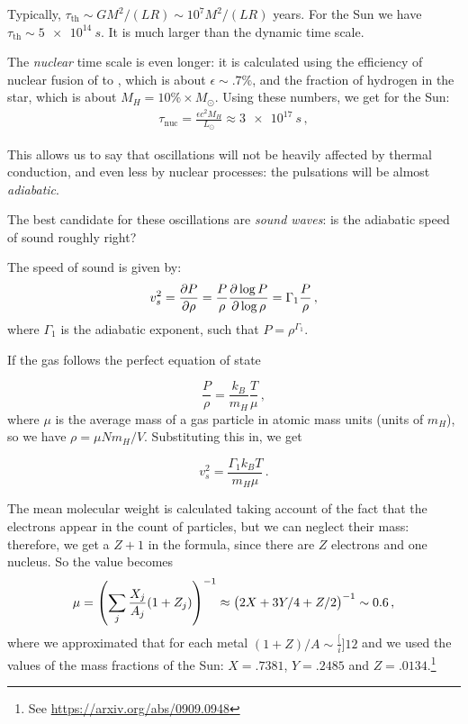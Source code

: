 \documentclass[main.tex]{subfiles}
\begin{document}
Typically, \(\tau_{\text{th}} \sim G M^2 /(LR) \sim 10^7 M^2/(LR) \) years.  
For the Sun we have \(\tau_{\text{th}} \sim \SI{5e14}{s}\). 
It is much larger than the dynamic time scale.

The \emph{nuclear} time scale is even longer: it is calculated using the efficiency of nuclear fusion of  to , which is about \(\epsilon \sim \num{.7} \% \), and the fraction of hydrogen in the star, which is about \(M_H = \num{10} \% \times M_{\odot} \). Using these numbers, we get for the Sun:
%
\begin{align}
\tau_{\text{nuc}} = \frac{\epsilon c^2  M_H}{L_{\odot}} \approx \SI{3e17}{s}
\,,
\end{align}
%


This allows us to say that oscillations will not be heavily affected by thermal conduction, and even less by nuclear processes: the pulsations will be almost \emph{adiabatic}.

The best candidate for these oscillations are \emph{sound waves}: is the adiabatic speed of sound roughly right?

The speed of sound is given by:
%
\begin{equation}
  v_s^2 = \pdv{P}{\rho } = \frac{P}{\rho} \pdv{\log P }{\log
  \rho } = \Gamma_1 \frac{P}{\rho}\,,
\end{equation}
%
where \(\Gamma_1 \) is the adiabatic exponent, such that \(P = \rho^{\Gamma_1 }\).  

If the gas follows the perfect equation of state

\begin{equation}
  \frac{P}{\rho} = \frac{k_B}{m_H} \frac{T}{\mu}  \,,
\end{equation}
%
where \(\mu \) is the average mass of a gas particle in atomic mass units (units of \(m_H\)), so we have \(\rho = \mu N m_H / V\). 
Substituting this in, we get

\begin{equation}
  v_s^2 = \frac{\Gamma_1 k_B T}{m_H \mu}  \,.
\end{equation}

The mean molecular weight is calculated taking account of the fact that the electrons appear in the count of particles, but we can neglect their mass: therefore, we get a \(Z+1\) in the formula, since there are \(Z\) electrons and one nucleus. So the value becomes 
%
\begin{align}
\mu = \qty(\sum_{j} \frac{X_j}{A_j} (1+Z_j))^{-1} \approx \qty(2X + 3Y/4 + Z/2)^{-1} \sim 0.6
\,,
\end{align}
%
where we approximated that for each metal \((1+Z) / A \sim \frac[i]{1}{2} \) and we used the values of the mass fractions of the Sun: \(X =\num{.7381}\), \(Y = \num{.2485}\) and \(Z = \num{.0134}\).\footnote{See \url{https://arxiv.org/abs/0909.0948}} 
\end{document}
